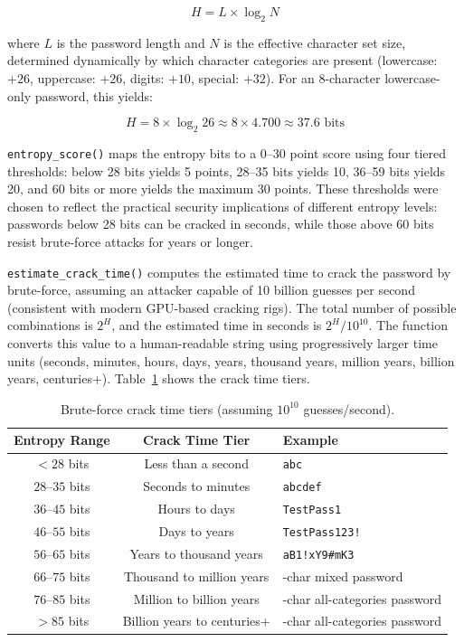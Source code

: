 \begin{equation}
H = L \times \log_2 N
\end{equation}

where $L$ is the password length and $N$ is the effective character set size, determined dynamically by which character categories are present (lowercase: $+26$, uppercase: $+26$, digits: $+10$, special: $+32$). For an 8-character lowercase-only password, this yields:

\begin{equation}
H = 8 \times \log_2 26 \approx 8 \times 4.700 \approx 37.6 \text{ bits}
\end{equation}

\texttt{entropy\_score()} maps the entropy bits to a 0--30 point score using four tiered thresholds: below 28 bits yields 5 points, 28--35 bits yields 10, 36--59 bits yields 20, and 60 bits or more yields the maximum 30 points. These thresholds were chosen to reflect the practical security implications of different entropy levels: passwords below 28 bits can be cracked in seconds, while those above 60 bits resist brute-force attacks for years or longer.

\texttt{estimate\_crack\_time()} computes the estimated time to crack the password by brute-force, assuming an attacker capable of 10 billion guesses per second (consistent with modern GPU-based cracking rigs). The total number of possible combinations is $2^{H}$, and the estimated time in seconds is $2^{H} / 10^{10}$. The function converts this value to a human-readable string using progressively larger time units (seconds, minutes, hours, days, years, thousand years, million years, billion years, centuries+). Table~\ref{tab:crack_time_tiers} shows the crack time tiers.

\begin{table}[H]
\centering
\caption{Brute-force crack time tiers (assuming $10^{10}$ guesses/second).}
\label{tab:crack_time_tiers}
\begin{tabularx}{\textwidth}{cc>{\raggedright\arraybackslash}p{5cm}}
\toprule
\textbf{Entropy Range} & \textbf{Crack Time Tier} & \textbf{Example} \\
\midrule
$< 28$ bits & Less than a second & \texttt{abc} \\
$28$--$35$ bits & Seconds to minutes & \texttt{abcdef} \\
$36$--$45$ bits & Hours to days & \texttt{TestPass1} \\
$46$--$55$ bits & Days to years & \texttt{TestPass123!} \\
$56$--$65$ bits & Years to thousand years & \texttt{aB1!xY9\#mK3} \\
$66$--$75$ bits & Thousand to million years & 16-char mixed password \\
$76$--$85$ bits & Million to billion years & 16-char all-categories password \\
$> 85$ bits & Billion years to centuries+ & 20-char all-categories password \\
\bottomrule
\end{tabularx}
\end{table}

